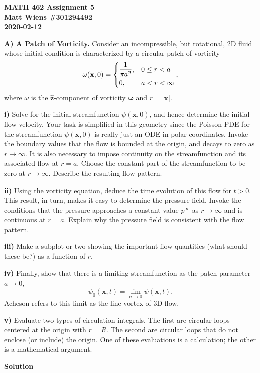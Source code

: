 \documentclass{article}
\def\*#1{\mathbf{#1}}
\newcommand{\zhat}{\mathbf{\hat{z}}}
\newcommand{\omegavec}{\boldsymbol{\omega}}
\begin{document}
\textbf{MATH 462 Assignment 5} \\
\textbf{Matt Wiens \#301294492} \\
\textbf{2020-02-12}

\textbf{A) A Patch of Vorticity.}
Consider an incompressible, but rotational, 2D fluid whose initial
condition is characterized by a circular patch of vorticity
%
\begin{equation*}
    \omega(\*x, 0) =
        \begin{dcases}
            \frac{1}{\pi a^2},& 0 \leq r < a \\
            0,& a < r < \infty
        \end{dcases}
        ,
\end{equation*}
%
where $\omega$ is the $\zhat$-component of vorticity $\omegavec$ and $r
= |\*x|$.

\textbf{i)} Solve for the initial streamfunction $\psi(\*x, 0)$, and
hence determine the initial flow velocity. Your task is simplified in
this geometry since the Poisson PDE for the streamfunction $\psi(\*x,
0)$ is really just an ODE in polar coordinates. Invoke the boundary
values that the flow is bounded at the origin, and decays to zero as $r
\to \infty$. It is also necessary to impose continuity on the
streamfunction and its associated flow at $r = a$. Choose the constant
part of the streamfunction to be zero at $r \to \infty$. Describe the
resulting flow pattern.

\textbf{ii)} Using the vorticity equation, deduce the time evolution of
this flow for $t > 0$. This result, in turn, makes it easy to determine
the pressure field. Invoke the conditions that the pressure approaches a
constant value $p^\infty$ as $r \to \infty$ and is continuous at $r =
a$. Explain why the pressure field is consistent with the flow pattern.

\textbf{iii)} Make a subplot or two showing the important flow
quantities (what should these be?) as a function of $r$.

\textbf{iv)} Finally, show that there is a limiting streamfunction as the patch
parameter $a \to 0$,
%
\begin{equation*}
    \psi_0(\*x, t) = \lim_{a \to 0} \psi(\*x, t)
    .
\end{equation*}
%
Acheson refers to this limit as the line vortex of 3D flow.

\textbf{v)} Evaluate two types of circulation integrals. The first are
circular loops centered at the origin with $r = R$. The second are
circular loops that do not enclose (or include) the origin. One of these
evaluations is a calculation; the other is a mathematical argument.

\newpage

\textbf{Solution}
\end{document}
